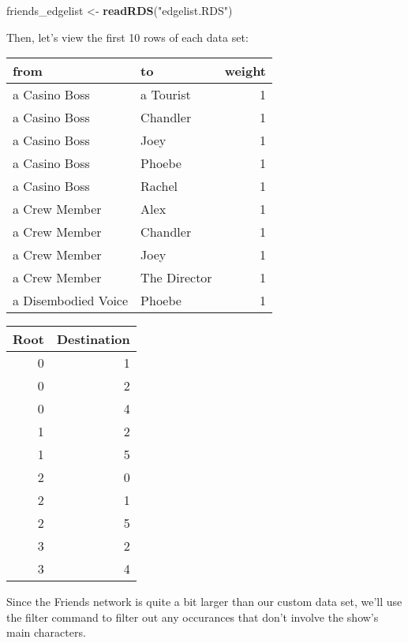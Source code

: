 \documentclass[]{article}
\newenvironment{Shaded}{\begin{snugshade}}{\end{snugshade}}
\newcommand{\KeywordTok}[1]{\textcolor[rgb]{0.13,0.29,0.53}{\textbf{#1}}}
\newcommand{\DecValTok}[1]{\textcolor[rgb]{0.00,0.00,0.81}{#1}}
\newcommand{\StringTok}[1]{\textcolor[rgb]{0.31,0.60,0.02}{#1}}
\newcommand{\OperatorTok}[1]{\textcolor[rgb]{0.81,0.36,0.00}{\textbf{#1}}}
\newcommand{\NormalTok}[1]{#1}
\begin{document}
\begin{Shaded}
\begin{Highlighting}[]
\NormalTok{friends_edgelist <-}\StringTok{ }\KeywordTok{readRDS}\NormalTok{(}\StringTok{"edgelist.RDS"}\NormalTok{) }
\end{Highlighting}
\end{Shaded}

Then, let's view the first 10 rows of each data set:

\begin{Shaded}
\end{Shaded}

\begin{longtable}[]{@{}llr@{}}
\toprule
from & to & weight\tabularnewline
\midrule
\endhead
a Casino Boss & a Tourist & 1\tabularnewline
a Casino Boss & Chandler & 1\tabularnewline
a Casino Boss & Joey & 1\tabularnewline
a Casino Boss & Phoebe & 1\tabularnewline
a Casino Boss & Rachel & 1\tabularnewline
a Crew Member & Alex & 1\tabularnewline
a Crew Member & Chandler & 1\tabularnewline
a Crew Member & Joey & 1\tabularnewline
a Crew Member & The Director & 1\tabularnewline
a Disembodied Voice & Phoebe & 1\tabularnewline
\bottomrule
\end{longtable}

\begin{Shaded}
\end{Shaded}

\begin{longtable}[]{@{}rr@{}}
\toprule
Root & Destination\tabularnewline
\midrule
\endhead
0 & 1\tabularnewline
0 & 2\tabularnewline
0 & 4\tabularnewline
1 & 2\tabularnewline
1 & 5\tabularnewline
2 & 0\tabularnewline
2 & 1\tabularnewline
2 & 5\tabularnewline
3 & 2\tabularnewline
3 & 4\tabularnewline
\bottomrule
\end{longtable}

Since the Friends network is quite a bit larger than our custom data
set, we'll use the filter command to filter out any occurances that
don't involve the show's main characters.
\end{document}
